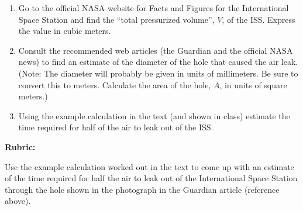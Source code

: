 \documentclass[12pt]{article}
\begin{document}
\begin{enumerate}
    \item[a.] Go to the official NASA website for Facts and Figures for the International Space Station and find the ``total pressurized volume'', $V$, of the ISS. Express the value in cubic meters.
    
    \item[b.] Consult the recommended web articles (the Guardian and the official NASA news) to find an estimate of the diameter of the hole that caused the air leak. (Note: The diameter will probably be given in units of millimeters. Be sure to convert this to meters. Calculate the area of the hole, $A$, in units of square meters.)
    
    \item[c.] Using the example calculation in the text (and shown in class) estimate the time required for half of the air to leak out of the ISS.
\end{enumerate}

\newpage
\vspace{0.5cm}
\noindent \textbf{Rubric:}

\noindent Use the example calculation worked out in the text to come up with an estimate of the time required for half the air to leak out of the International Space Station through the hole shown in the photograph in the Guardian article (reference above).
\end{document}
